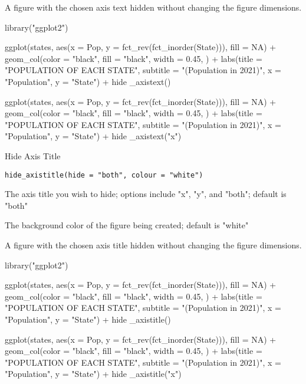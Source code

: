 \documentclass[a4paper]{book}
\begin{document}
%
\begin{Value}
A figure with the chosen axis text hidden without changing the figure dimensions.
\end{Value}
%
\begin{Examples}
\begin{ExampleCode}
library("ggplot2")

ggplot(states, aes(x = Pop, y = fct_rev(fct_inorder(State))), fill = NA) +
geom_col(color = "black", fill = "black", width = 0.45, ) +
labs(title = "POPULATION OF EACH STATE",
    subtitle = "(Population in 2021)",
    x = "Population",
    y = "State") +
hide _axistext()

ggplot(states, aes(x = Pop, y = fct_rev(fct_inorder(State))), fill = NA) +
geom_col(color = "black", fill = "black", width = 0.45, ) +
labs(title = "POPULATION OF EACH STATE",
    subtitle = "(Population in 2021)",
    x = "Population",
    y = "State") +
hide _axistext("x")
\end{ExampleCode}
\end{Examples}
%
\begin{Description}\relax
Hide Axis Title
\end{Description}
%
\begin{Usage}
\begin{verbatim}
hide_axistitle(hide = "both", colour = "white")
\end{verbatim}
\end{Usage}
%
\begin{Arguments}
\begin{ldescription}
\item[\code{hide}] The axis title you wish to hide; options include "x", "y", and "both"; default is "both"

\item[\code{colour}] The background color of the figure being created; default is "white"
\end{ldescription}
\end{Arguments}
%
\begin{Value}
A figure with the chosen axis title hidden without changing the figure dimensions.
\end{Value}
%
\begin{Examples}
\begin{ExampleCode}
library("ggplot2")

ggplot(states, aes(x = Pop, y = fct_rev(fct_inorder(State))), fill = NA) +
geom_col(color = "black", fill = "black", width = 0.45, ) +
labs(title = "POPULATION OF EACH STATE",
    subtitle = "(Population in 2021)",
    x = "Population",
    y = "State") +
hide _axistitle()

ggplot(states, aes(x = Pop, y = fct_rev(fct_inorder(State))), fill = NA) +
geom_col(color = "black", fill = "black", width = 0.45, ) +
labs(title = "POPULATION OF EACH STATE",
    subtitle = "(Population in 2021)",
    x = "Population",
    y = "State") +
hide _axistitle("x")
\end{ExampleCode}
\end{Examples}
\end{document}
